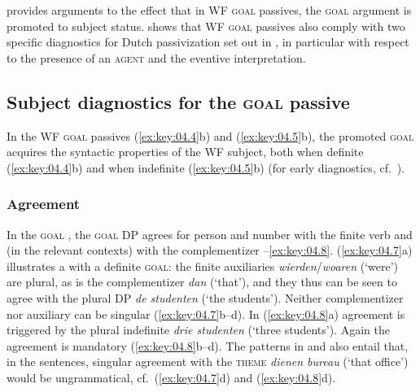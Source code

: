 \documentclass[output=paper]{langsci/langscibook}
\begin{document}
 provides arguments to the effect that in
\gls{WF} \textsc{goal} passives, the \textsc{goal} argument is
promoted to subject status.  shows that
\gls{WF} \textsc{goal} passives also comply with two specific
diagnostics for Dutch passivization set out in
\textcite{BroekhuisCornips2004,BroekhuisCornips2012}, in particular with
respect to the presence of an \textsc{agent} and the eventive interpretation.

\subsection{Subject diagnostics for the \textsc{goal}
passive}\label{sec:key:04.2.2}

In the \gls{WF} \textsc{goal} passives (\ref{ex:key:04.4}b) and
(\ref{ex:key:04.5}b), the promoted \textsc{goal} acquires the syntactic properties
of the \gls{WF} subject, both when definite (\ref{ex:key:04.4}b)
and when indefinite (\ref{ex:key:04.5}b) (for early diagnostics, cf.\
\citealt{Haegeman1986a,Haegeman1986b}).

\subsubsection{Agreement}\label{ssub:agreement}

In the \textsc{goal} , the \textsc{goal} DP agrees for person and
number with the finite verb and (in the relevant contexts) with the
complementizer \REF{ex:key:04.7}--\eqref{ex:key:04.8}. (\ref{ex:key:04.7}a)
illustrates a \isi{passive} with a definite \textsc{goal}: the finite
auxiliaries \emph{wierden}/\emph{woaren} (‘were’) are plural, as is the
complementizer \emph{dan} (‘that’), and they thus can be seen to agree with the
plural DP \emph{de studenten} (‘the students’). Neither complementizer nor
auxiliary can be singular (\ref{ex:key:04.7}b--d). In (\ref{ex:key:04.8}a) agreement is
triggered by the plural indefinite \emph{drie studenten} (‘three students’).
Again the agreement is mandatory (\ref{ex:key:04.8}b--d). The patterns in  and
\REF{ex:key:04.8} also entail that, in the \isi{passive} sentences, singular
agreement with the \textsc{theme} \emph{dienen bureau} (‘that office’) would be
ungrammatical, cf.\ (\ref{ex:key:04.7}d) and (\ref{ex:key:04.8}d).
\end{document}
